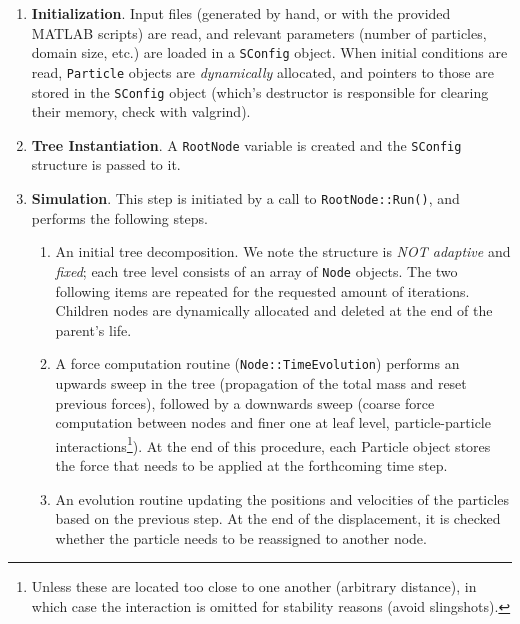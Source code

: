 \documentclass[10pt,a4paper]{scrartcl}
\begin{document}
	\begin{enumerate}
		\item \textbf{Initialization}. Input files (generated by hand, or with the provided MATLAB scripts) are read, and relevant parameters (number of particles, domain size, etc.) are loaded in a \verb|SConfig| object. When initial conditions are read, \verb|Particle| objects are \emph{dynamically} allocated, and pointers to those are stored in the \verb|SConfig| object (which's destructor is responsible for clearing their memory, check with valgrind).
		\item \textbf{Tree Instantiation}. A \verb|RootNode| variable is created and the \verb|SConfig| structure is passed to it.
		\item \textbf{Simulation}. This step is initiated by a call to \verb|RootNode::Run()|, and performs the following steps.
		\begin{enumerate}
			\item An initial tree decomposition. We note the structure is \emph{NOT adaptive} and \emph{fixed}; each tree level consists of an array of \verb|Node| objects. The two following items are repeated for the requested amount of iterations. Children nodes are dynamically allocated and deleted at the end of the parent's life.
			\item A force computation routine (\verb|Node::TimeEvolution|) performs an upwards sweep in the tree (propagation of the total mass and reset previous forces), followed by a downwards sweep (coarse force computation between nodes and finer one at leaf level, particle-particle interactions\footnote{Unless these are located too close to one another (arbitrary distance), in which case the interaction is omitted for stability reasons (avoid slingshots).}). At the end of this procedure, each Particle object stores the force that needs to be applied at the forthcoming time step.
			\item An evolution routine updating the positions and velocities of the particles based on the previous step. At the end of the displacement, it is checked whether the particle needs to be reassigned to another node.
		\end{enumerate}
	\end{enumerate}
	
\end{document}
